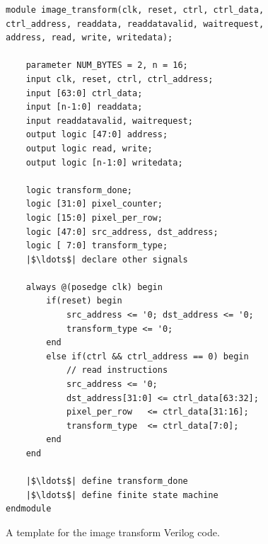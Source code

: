 \documentclass[epsfig,10pt,fullpage]{article}
\begin{document}
\begin{figure}[h]
\begin{center}
\begin{minipage}[h]{15 cm}
\begin{lstlisting}[name=code]
module image_transform(clk, reset, ctrl, ctrl_data, ctrl_address, readdata, readdatavalid, waitrequest, address, read, write, writedata);

    parameter NUM_BYTES = 2, n = 16;
    input clk, reset, ctrl, ctrl_address;
    input [63:0] ctrl_data;
    input [n-1:0] readdata;
    input readdatavalid, waitrequest;
    output logic [47:0] address;
    output logic read, write;
    output logic [n-1:0] writedata;

    logic transform_done;
    logic [31:0] pixel_counter;
    logic [15:0] pixel_per_row;
    logic [47:0] src_address, dst_address;
    logic [ 7:0] transform_type;
    |$\ldots$| declare other signals

    always @(posedge clk) begin
        if(reset) begin
            src_address <= '0; dst_address <= '0; 
            transform_type <= '0;
        end
        else if(ctrl && ctrl_address == 0) begin    
            // read instructions
            src_address <= '0;
            dst_address[31:0] <= ctrl_data[63:32];
            pixel_per_row   <= ctrl_data[31:16];
            transform_type  <= ctrl_data[7:0];
        end
    end

    |$\ldots$| define transform_done
    |$\ldots$| define finite state machine
endmodule
\end{lstlisting}
\end{minipage}
\caption{A template for the image transform Verilog code.}
\label{fig:templatePart1}
\end{center}
\end{figure}
\end{document}
